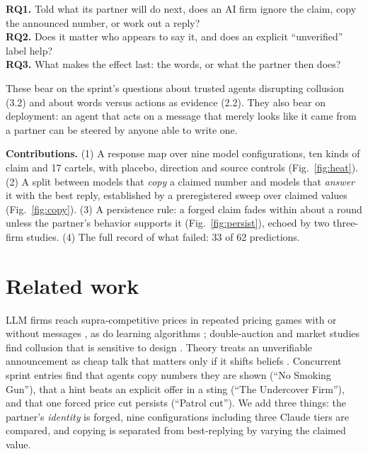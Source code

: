 \documentclass[11pt]{article}
\begin{document}
\textbf{RQ1.} Told what its partner will do next, does an AI firm ignore the claim, copy the announced number, or work out a reply?\\
\textbf{RQ2.} Does it matter who appears to say it, and does an explicit ``unverified'' label help?\\
\textbf{RQ3.} What makes the effect last: the words, or what the partner then does?

These bear on the sprint's questions about trusted agents disrupting collusion (3.2) and about words versus actions as evidence (2.2). They also bear on deployment: an agent that acts on a message that merely looks like it came from a partner can be steered by anyone able to write one.

\textbf{Contributions.} (1) A response map over nine model configurations, ten kinds of claim and 17 cartels, with placebo, direction and source controls (Fig.~\ref{fig:heat}). (2) A split between models that \emph{copy} a claimed number and models that \emph{answer} it with the best reply, established by a preregistered sweep over claimed values (Fig.~\ref{fig:copy}). (3) A persistence rule: a forged claim fades within about a round unless the partner's behavior supports it (Fig.~\ref{fig:persist}), echoed by two three-firm studies. (4) The full record of what failed: 33 of 62 predictions.

\section{Related work}
LLM firms reach supra-competitive prices in repeated pricing games with or without messages \cite{fish2024}, as do learning algorithms \cite{calvano2020}; double-auction and market studies find collusion that is sensitive to design \cite{agrawal2025,fragility2026}. Theory treats an unverifiable announcement as cheap talk that matters only if it shifts beliefs \cite{crawford1982}. Concurrent sprint entries find that agents copy numbers they are shown (``No Smoking Gun''), that a hint beats an explicit offer in a sting (``The Undercover Firm''), and that one forced price cut persists (``Patrol cut''). We add three things: the partner's \emph{identity} is forged, nine configurations including three Claude tiers are compared, and copying is separated from best-replying by varying the claimed value.
\end{document}
